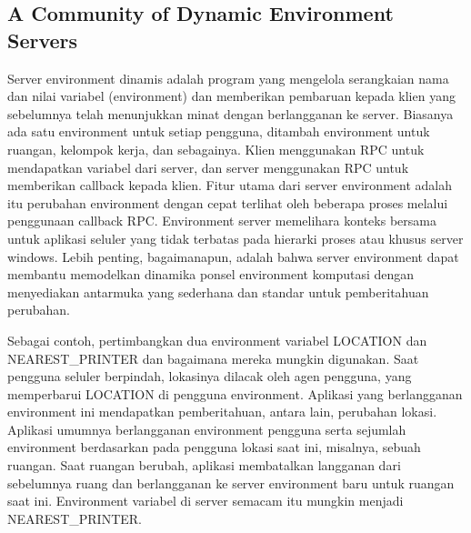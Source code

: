 \subsection {A Community of Dynamic Environment Servers}

Server environment dinamis adalah program yang mengelola serangkaian nama dan nilai variabel (environment) dan memberikan pembaruan kepada klien yang sebelumnya telah menunjukkan minat dengan berlangganan ke server. Biasanya ada satu environment untuk setiap pengguna, ditambah environment untuk ruangan, kelompok kerja, dan sebagainya. Klien menggunakan RPC untuk mendapatkan variabel dari server, dan server menggunakan RPC untuk memberikan callback kepada klien. Fitur utama dari server environment adalah itu perubahan environment dengan cepat terlihat oleh beberapa proses melalui penggunaan callback RPC. Environment server memelihara konteks bersama untuk aplikasi seluler yang tidak terbatas pada hierarki proses atau khusus server windows. Lebih penting, bagaimanapun, adalah bahwa server environment dapat membantu memodelkan dinamika ponsel environment komputasi dengan menyediakan antarmuka yang sederhana dan standar untuk pemberitahuan perubahan.

Sebagai contoh, pertimbangkan dua environment variabel LOCATION dan NEAREST_PRINTER dan bagaimana mereka mungkin digunakan. Saat pengguna seluler berpindah, lokasinya dilacak oleh agen pengguna, yang memperbarui LOCATION di pengguna environment. Aplikasi yang berlangganan environment ini mendapatkan pemberitahuan, antara lain, perubahan lokasi.
Aplikasi umumnya berlangganan environment pengguna serta sejumlah environment berdasarkan pada pengguna lokasi saat ini, misalnya, sebuah ruangan. Saat ruangan berubah, aplikasi membatalkan langganan dari sebelumnya ruang dan berlangganan ke server environment baru untuk ruangan saat ini. Environment variabel di server semacam itu mungkin menjadi NEAREST_PRINTER.
\cite{schilit1993customizing}









